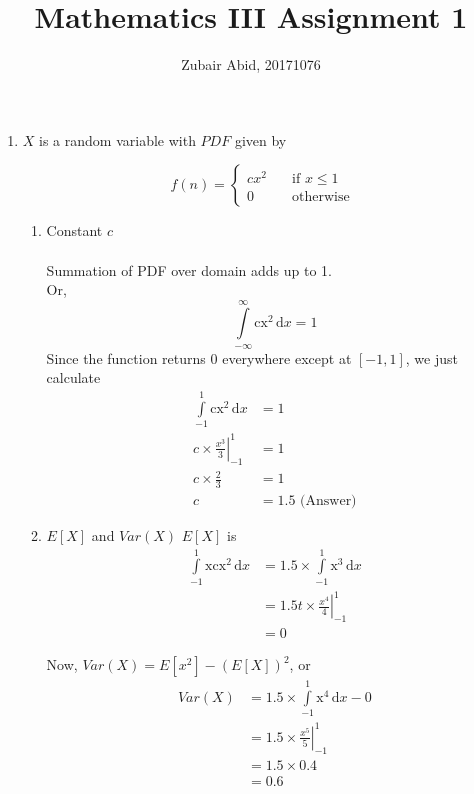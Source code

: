 \documentclass[a4paper, 12pt]{article}
\title{Mathematics III Assignment 1}
\author{Zubair Abid, 20171076}
\begin{document}
\maketitle

\begin{enumerate}

	\item 
	$X$ is a random variable with $PDF$ given by
	
	\[ f(n) = 
		\begin{cases}
			cx^2 & \quad \text{if } x \leq 1 \\
			0 & \quad \text{otherwise}
		\end{cases}
	\]

	\begin{enumerate}
		\item Constant $c$
		\\ \\
		Summation of PDF over domain adds up to 1.\\
		Or, 
		\[
		\int\limits_{-\infty}^{\infty} \mathrm{cx^2}
		\, \mathrm{d}x = 1
		\]
		Since the function returns $0$ everywhere except
		 at $[-1, 1]$, 	we just calculate
		\begin{align*}
			\int\limits_{-1}^{1} \mathrm{cx^2}\, 
			\mathrm{d}x &= 1\\
			c\times \left.\frac{x^3}{3}\right|_{-1}^{1} &= 1\\
			c\times \frac{2}{3} &= 1\\
			c &= 1.5 \text{ (Answer)}
		\end{align*}				
		
		\item $E\left[X\right]$ and $Var\left(X\right)$
		$E[X]$ is 
		\begin{align*}
			\int\limits_{-1}^{1} \mathrm{xcx^2}\,\mathrm{d}x
			&= 1.5 \times \int\limits_{-1}^{1} 
			\mathrm{x^3}\,\mathrm{d}x\\
			&= 1.5 t\times \left.\frac{x^4}{4}\right|_{-1}^{1}\\
			&= 0
		\end{align*}
			
		Now, $Var(X) = E[x^2] - (E[X])^2$, or\\
		\begin{align*}
			Var(X) &= 1.5\times \int\limits_{-1}^{1} 
			\mathrm{x^4}\,\mathrm{d}x - 0\\
			&= 1.5\times \left.\frac{x^5}{5}\right|_{-1}^{1} \\
			&= 1.5 \times 0.4\\
			&= 0.6
		\end{align*}
		

\end{enumerate}
\end{enumerate}
\end{document}
